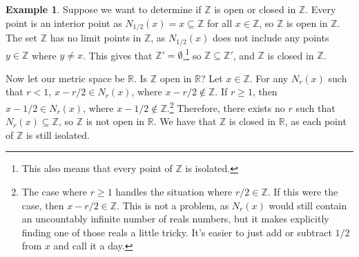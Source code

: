 \documentclass{article}
\newcommand{\R}{\mathbb{R}}
\newcommand{\Z}{\mathbb{Z}}
\theoremstyle{definition}
\newtheorem{example}{Example}[section]
\begin{document}
\begin{example}
	Suppose we want to determine if $ \Z $ is open or closed in $ \Z $. Every point is an interior point as $ N_{1/2}(x)={x}\subseteq\Z $ for all $ x\in\Z $, so $ \Z $ is open in $ \Z $. The set $ \Z $ has no limit points in $ \Z $, as $ N_{1/2}(x) $ does not include any points $ y\in\Z $ where $ y\neq x $. This gives that $ \Z'=\emptyset $,\footnote{This also means that every point of $ \Z $ is isolated.} so $ \Z\subseteq \Z' $, and $ \Z $ is closed in $ \Z $.
	
	 Now let our metric space be $ \R $. Is $ \Z $ open in $ \R $? Let $ x\in\Z $. For any $ N_r(x) $ such that $ r<1 $, $ x-r/2\in N_r(x) $, where $ x-r/2\notin\Z $. If $ r\ge 1 $, then $ x-1/2\in N_r(x) $, where $ x-1/2\notin\Z $.\footnote{The case where $ r\ge 1 $ handles the situation where $ r/2\in\Z $. If this were the case, then $ x-r/2\in\Z $. This is not a problem, as $ N_r(x) $ would still contain an uncountably infinite number of reals numbers, but it makes explicitly finding one of those reals a little tricky. It's easier to just add or subtract $ 1/2 $ from $ x $ and call it a day.} Therefore, there exists no $ r $ such that $ N_r(x)\subseteq \Z $, so $ \Z $ is not open in $ \R $. We have that $ \Z $ is closed in $ \R $, as each point of $ \Z $ is still isolated.  
\end{example}
\end{document}
